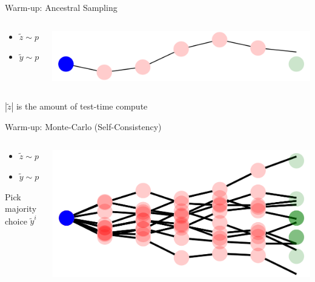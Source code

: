 \documentclass[14pt,aspectratio=169]{beamer}
\begin{document}
\begin{frame}{Warm-up: Ancestral Sampling}
	\begin{columns}
		\begin{column}{0.5\linewidth}
			\begin{itemize}
				\item $\tilde{z} \sim p(z | x)$
				\item $\tilde{y} \sim p(y | x, z=\tilde{z})$
			\end{itemize}
		\end{column}
		\begin{column}{0.5\linewidth}
			\includegraphics[width=\textwidth]{images/ancestral.png}
		\end{column}
	\end{columns}
    \vspace{1cm}
    $|\tilde{z}|$ is the amount of test-time compute
\end{frame}

\begin{frame}{Warm-up: Monte-Carlo (Self-Consistency)}
	\begin{columns}
		\begin{column}{0.5\linewidth}
			\begin{itemize}
				\item $\tilde{z} \sim p(z | x)$
				\item $\tilde{y} \sim p(y | x, \tilde{z})$
			\end{itemize}
            \vspace{1cm}
			Pick majority choice $\tilde{y}^i$
		\end{column}
		\begin{column}{0.5\linewidth}
			\includegraphics[width=\textwidth]{images/bwalk.png}
		\end{column}
	\end{columns}
\end{frame}
\end{document}
